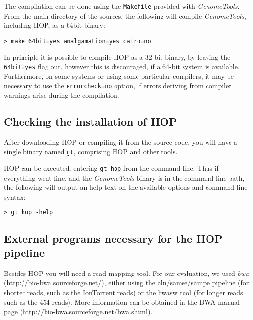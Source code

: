 \documentclass[12pt,titlepage]{article}
\newcommand{\GenomeTools}{\textit{GenomeTools}\xspace}
\newcommand{\Hop}{{HOP}\xspace}
\newcommand{\Gtcmd}{\texttt{gt}\xspace}
\begin{document}
The compilation can be done using the \texttt{Makefile} provided with
\GenomeTools. From the main directory of the sources, the following will
compile \GenomeTools, including \Hop, as a 64bit binary:

\begin{footnotesize}
\begin{verbatim}
> make 64bit=yes amalgamation=yes cairo=no
\end{verbatim}
\end{footnotesize}

In principle it is possible to compile \Hop as a 32-bit binary, by
leaving the \texttt{64bit=yes} flag out, however this is discouraged,
if a 64-bit system is available. Furthermore, on some systems
or using some particular compilers, it may be necessary to use the
\texttt{errorcheck=no} option, if errors deriving from compiler warnings
arise during the compilation.

\subsection{Checking the installation of \Hop}

After downloading \Hop or compiling it from the source code, you
will have a single binary named \Gtcmd, comprising \Hop and other tools.

\Hop can be executed, entering \texttt{gt hop} from the command line.
Thus if everything went fine, and the \GenomeTools binary is in
the command line path, the following will output an help text on the
available options and command line syntax:

\begin{footnotesize}
\begin{verbatim}
> gt hop -help
\end{verbatim}
\end{footnotesize}

\subsection{External programs necessary for the \Hop pipeline}

Besides \Hop you will need a read mapping tool. For our evaluation,
we used \textit{bwa} (\url{http://bio-bwa.sourceforge.net/}),
either using the aln/samse/sampe pipeline (for shorter reads, such
as the IonTorrent reads) or the bwasw tool (for longer reads such as
the 454 reads). More information can be obtained
in the BWA manual page (\url{http://bio-bwa.sourceforge.net/bwa.shtml}).
\end{document}
